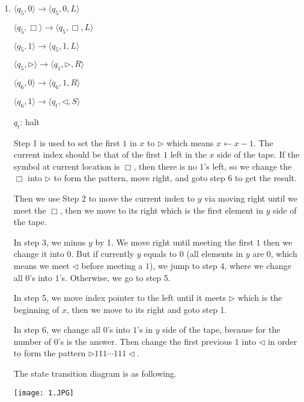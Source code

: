 \documentclass[12pt,a4paper]{article}
\makeatletter
\newtheorem*{solution}{Solution}
\theoremstyle{definition}
\renewenvironment{solution}[1][Solution] {\par\pushQED{\qed}\normalfont\topsep6\p@\@plus6\p@\relax\trivlist\item[\hskip\labelsep\bfseries#1\@addpunct{.}]\ignorespaces}{\popQED\endtrivlist\@endpefalse} \makeatother
\makeatother
\begin{document}
\begin{enumerate}
\begin{solution}
\begin{minipage}{0.5\textwidth}
\begin{center}
			
			$\langle q_5,0\rangle\rightarrow\langle q_5,0,L\rangle$
			
			$\langle q_5,\Box\rangle\rightarrow\langle q_5,\Box,L\rangle$
			
			$\langle q_5,1\rangle\rightarrow\langle q_5,1,L\rangle$
			
			$\langle q_5,\triangleright\rangle\rightarrow\langle q_1,\triangleright,R\rangle$
			
			
			$\langle q_6,0\rangle\rightarrow\langle q_6,1,R\rangle$
			
			$\langle q_6,1\rangle\rightarrow\langle q_t,\triangleleft,S\rangle$
			
			$q_t$: halt
		\end{center}
	\end{minipage}
	\quad\par
	Step 1 is used to set the first $1$ in $x$ to $\triangleright$ which means $x\leftarrow x-1$. The current index should be that of the first $1$ left in the $x$ side of the tape. If the symbol at current location is $\Box$, then there is no $1$'s left, so we change the $\Box$ into $\triangleright$ to form the pattern, move right, and goto step 6 to get the result.
	
	Then we use Step 2 to move the current index to $y$ via moving right until we meet the $\Box$, then we move to its right which is the first element in $y$ side of the tape.
	
	In step 3, we minus $y$ by 1. We move right until meeting the first $1$ then we change it into $0$. But if currently $y$ equals to $0$ (all elements in $y$ are $0$, which means we meet $\triangleleft$ before meeting a $1$), we jump to step $4$, where we change all $0$'s into $1$'s. Otherwise, we go to step 5.
	
	In step 5, we move index pointer to the left until it meets $\triangleright$ which is the beginning of $x$, then we move to its right and goto step 1.
	
	In step 6, we change all $0$'s into $1$'s in $y$ side of the tape, because for the number of $0$'s is the answer. Then change the first previous $1$ into $\triangleleft$ in order to form the pattern $\triangleright 111\cdots 111 \triangleleft$.
	
	The state transition diagram is as following.
	
	\begin{center}
		\texttt{[image: 1.JPG]}
	\end{center}


\end{solution}
\end{enumerate}
\end{document}
